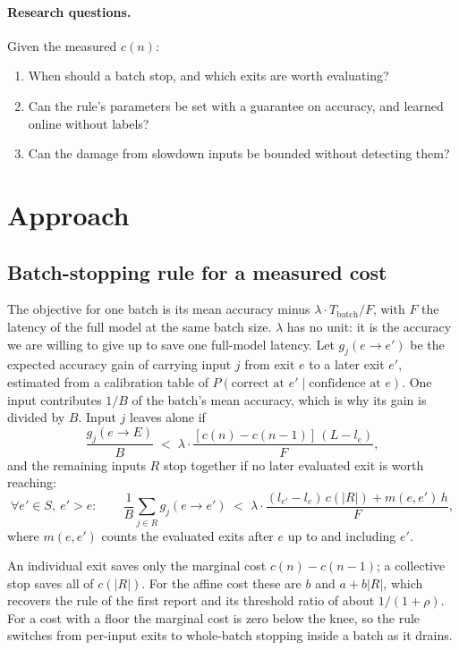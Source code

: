 \paragraph{Research questions.} Given the measured $c(n)$:
\begin{enumerate}
  \item When should a batch stop, and which exits are worth evaluating?
  \item Can the rule's parameters be set with a guarantee on accuracy, and learned online without labels?
  \item Can the damage from slowdown inputs be bounded without detecting them?
\end{enumerate}

\section{Approach}\label{sec:approach}

\subsection{Batch-stopping rule for a measured cost}\label{sec:rule}
The objective for one batch is its mean accuracy minus $\lambda\cdot T_{\text{batch}}/F$, with $F$ the latency of
the full model at the same batch size. $\lambda$ has no unit: it is the accuracy we are willing to give up to save
one full-model latency. Let $g_j(e\to e')$ be the expected accuracy gain of carrying input $j$ from exit $e$ to a
later exit $e'$, estimated from a calibration table of $P(\text{correct at } e' \mid \text{confidence at } e)$. One
input contributes $1/B$ of the batch's mean accuracy, which is why its gain is divided by $B$. Input $j$ leaves alone
if
\begin{equation}\label{eq:indiv}
  \frac{g_j(e\to E)}{B} \;<\; \lambda\cdot\frac{[c(n)-c(n-1)]\,(L-l_e)}{F},
\end{equation}
and the remaining inputs $R$ stop together if no later evaluated exit is worth reaching:
\begin{equation}\label{eq:coll}
  \forall e'\in S,\ e'>e:\qquad \frac{1}{B}\sum_{j\in R} g_j(e\to e') \;<\;
  \lambda\cdot\frac{(l_{e'}-l_e)\,c(|R|) + m(e,e')\,h}{F},
\end{equation}
where $m(e,e')$ counts the evaluated exits after $e$ up to and including $e'$.

An individual exit saves only the marginal cost $c(n)-c(n-1)$; a collective stop saves all of $c(|R|)$. For the
affine cost these are $b$ and $a+b|R|$, which recovers the rule of the first report and its threshold ratio of about
$1/(1+\rho)$. For a cost with a floor the marginal cost is zero below the knee, so the rule switches from per-input
exits to whole-batch stopping inside a batch as it drains.

